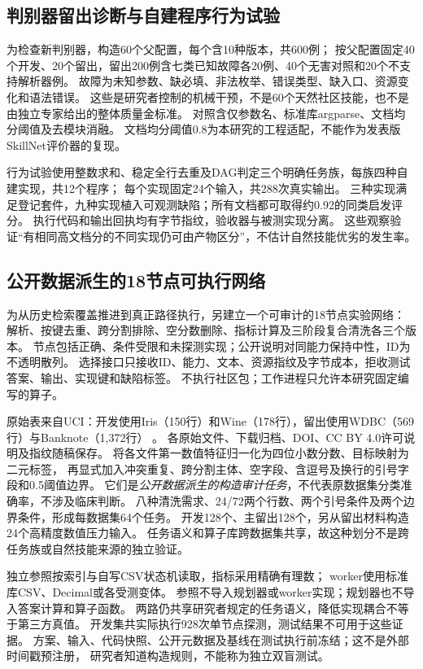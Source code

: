 \subsection{判别器留出诊断与自建程序行为试验}
为检查新判别器，构造60个父配置，每个含10种版本，共600例；
按父配置固定40个开发、20个留出，留出200例含七类已知故障各20例、40个无害对照和20个不支持解析器例。
故障为未知参数、缺必填、非法枚举、错误类型、缺入口、资源变化和语法错误。
这些是研究者控制的机械干预，不是60个天然社区技能，也不是由独立专家给出的整体质量金标准。
对照含仅参数名、标准库argparse、文档均分阈值及去模块消融。
文档均分阈值0.8为本研究的工程适配，不能作为发表版SkillNet评价器的复现。

行为试验使用整数求和、稳定全行去重及DAG判定三个明确任务族，每族四种自建实现，共12个程序；
每个实现固定24个输入，共288次真实输出。
三种实现满足登记套件，九种实现植入可观测缺陷；所有文档都可取得约0.92的同类启发评分。
执行代码和输出回执均有字节指纹，验收器与被测实现分离。
这些观察验证“有相同高文档分的不同实现仍可由产物区分”，不估计自然技能优劣的发生率。

\subsection{公开数据派生的18节点可执行网络}
为从历史检索覆盖推进到真正路径执行，另建立一个可审计的18节点实验网络：
解析、按键去重、跨分割排除、空分数删除、指标计算及三阶段复合清洗各三个版本。
节点包括正确、条件受限和未探测实现；公开说明对同能力保持中性，ID为不透明散列。
选择接口只接收ID、能力、文本、资源指纹及字节成本，拒收测试答案、输出、实现键和缺陷标签。
不执行社区包；工作进程只允许本研究固定编写的算子。

原始表来自UCI：开发使用Iris（150行）和Wine（178行），留出使用WDBC（569行）与Banknote（1,372行）
\citep{UCIiris,UCIwine,UCIwdbc,UCIbanknote}。
各原始文件、下载归档、DOI、CC BY 4.0许可说明及指纹随稿保存。
将各文件第一数值特征归一化为四位小数分数、目标映射为二元标签，
再显式加入冲突重复、跨分割主体、空字段、含逗号及换行的引号字段和0.5阈值边界。
它们是\emph{公开数据派生的构造审计任务}，不代表原数据集分类准确率，不涉及临床判断。
八种清洗需求、24/72两个行数、两个引号条件及两个边界条件，形成每数据集64个任务。
开发128个、主留出128个，另从留出材料构造24个高精度数值压力输入。
任务语义和算子库跨数据集共享，故这种划分不是跨任务族或自然技能来源的独立验证。

独立参照按索引与自写CSV状态机读取，指标采用精确有理数；
worker使用标准库CSV、Decimal或各受测变体。
参照不导入规划器或worker实现；规划器也不导入答案计算和算子函数。
两路仍共享研究者规定的任务语义，降低实现耦合不等于第三方真值。
开发集共实际执行928次单节点探测，测试结果不可用于这些证据。
方案、输入、代码快照、公开元数据及基线在测试执行前冻结；这不是外部时间戳预注册，
研究者知道构造规则，不能称为独立双盲测试。

